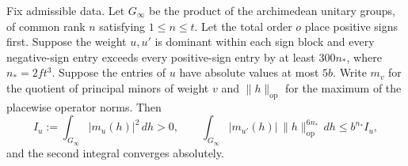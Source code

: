 \begin{lemma}
\label{lem:c-kernel-weighted-integral}
\emitthmsource
Fix admissible data. Let $G_\infty$ be the product of the archimedean unitary groups, of common rank $n$ satisfying $1\le n\le t$. Let the total order $o$ place positive signs first. Suppose the weight $u,u'$ is dominant within each sign block and every negative-sign entry exceeds every positive-sign entry by at least $300n_*$, where $n_*=2ft^3$. Suppose the entries of $u$ have absolute values at most $5b$. Write $m_v$ for the quotient of principal minors of weight $v$ and $\|h\|_{\mathrm{op}}$ for the maximum of the placewise operator norms. Then
\[
  I_u:=\int_{G_\infty}|m_u(h)|^2\,dh>0,
  \qquad
  \int_{G_\infty}|m_{u'}(h)|\,\|h\|_{\mathrm{op}}^{6n_*}\,dh
       \le b^{n_*}I_u,
\]
and the second integral converges absolutely.
\end{lemma}


